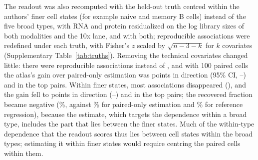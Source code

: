 The readout was also recomputed with the held-out truth centred within the authors' finer cell states (for example naive and memory B cells) instead of the five broad types, with RNA and protein residualized on the log library sizes of both modalities and the 10x lane, and with both; reproducible associations were redefined under each truth, with Fisher's $z$ scaled by $\sqrt{n-3-k}$ for $k$ covariates (Supplementary Table~\ref{tab:truths}). Removing the technical covariates changed little: there were \RvTechReps{} reproducible associations instead of \RvPrimaryReps, and with 100 paired cells the atlas's gain over paired-only estimation was \RvTechOneMinusPo{} points in direction (95\% CI, \RvTechOneMinusPoLo--\RvTechOneMinusPoHi) and \RvTechTwoMinusPo{} in the top pairs. Within finer states, most associations disappeared (\RvFineReps), and the gain fell to \RvFineOneMinusPo{} points in direction (\RvFineOneMinusPoLo--\RvFineOneMinusPoHi) and \RvFineTwoMinusPo{} in the top pairs; the recovered fraction became negative (\RvFineRfAtlas\%, against \RvFineRfPo\% for paired-only estimation and \RvFineRfReg\% for reference regression), because the estimate, which targets the dependence within a broad type, includes the part that lies between the finer states. Much of the within-type dependence that the readout scores thus lies between cell states within the broad types; estimating it within finer states would require centring the paired cells within them.

\begin{table}[h]
\caption{\textbf{The association test under permutation.} Share of Fisher-$z$ tests at or below each $P$ value when protein vectors were permuted across the cells of each half of a held-out unit (20 permutations), by the number of cells per half; tests are gene--protein pairs.}
\label{tab:fisher}
\centering\footnotesize

\end{table}

\begin{table}[h]
\caption{\textbf{The readout under other held-out truths.} The atlas estimate minus paired-only estimation (best of eight methods at each budget) and minus reference regression (best of six forms), with 100 paired cells and 95\% intervals from resampling donors, in the share of reproducible associations whose direction was predicted (E1), the share of reproducible associations of the predicted direction among the 100 largest predictions (E2) and the recovered fraction. Truths: centred within the five broad types (the published readout), within the authors' finer cell states, within broad types after residualizing on log library sizes and the 10x lane, and both.}
\label{tab:truths}
\centering\scriptsize

\end{table}

